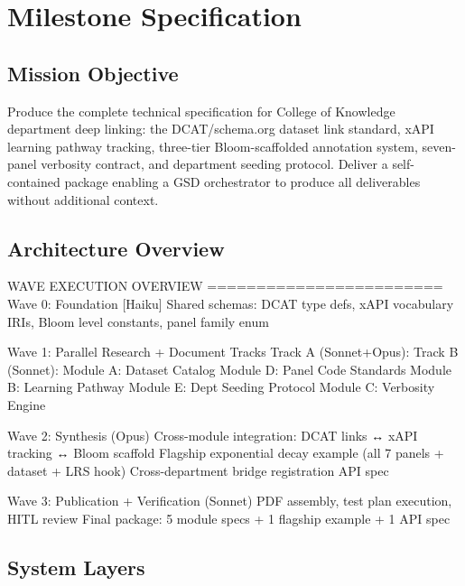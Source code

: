 \documentclass[11pt,letterpaper]{article}
\newcommand{\stageheader}[2]{%
  \noindent\colorbox{#2}{\makebox[\textwidth][l]{%
    \textcolor{white}{\bfseries\sffamily\hspace{6pt}#1\hspace{6pt}}}}%
  \vspace{0.5em}\par%
}
\begin{document}
\newpage
\stageheader{STAGE 3 --- MISSION PACKAGE}{tertiary}

\section{Milestone Specification}

\subsection{Mission Objective}

Produce the complete technical specification for College of Knowledge department deep linking: the DCAT/schema.org dataset link standard, xAPI learning pathway tracking, three-tier Bloom-scaffolded annotation system, seven-panel verbosity contract, and department seeding protocol. Deliver a self-contained package enabling a GSD orchestrator to produce all deliverables without additional context.

\subsection{Architecture Overview}

\begin{asciibox}
WAVE EXECUTION OVERVIEW
========================
Wave 0: Foundation
  [Haiku] Shared schemas: DCAT type defs, xAPI vocabulary IRIs,
          Bloom level constants, panel family enum

Wave 1: Parallel Research + Document Tracks
  Track A (Sonnet+Opus):     Track B (Sonnet):
  Module A: Dataset Catalog   Module D: Panel Code Standards
  Module B: Learning Pathway  Module E: Dept Seeding Protocol
  Module C: Verbosity Engine

Wave 2: Synthesis (Opus)
  Cross-module integration: DCAT links ↔ xAPI tracking ↔ Bloom scaffold
  Flagship exponential decay example (all 7 panels + dataset + LRS hook)
  Cross-department bridge registration API spec

Wave 3: Publication + Verification (Sonnet)
  PDF assembly, test plan execution, HITL review
  Final package: 5 module specs + 1 flagship example + 1 API spec
\end{asciibox}

\subsection{System Layers}
\end{document}
